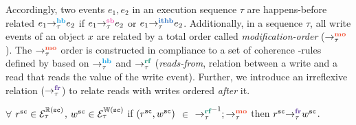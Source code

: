 Accordingly, two events $e_1,e_2$ in an execution sequence $\tau$ are happens-before 
related \ie
$\hb{\tau}{e_1}{e_2}$ if $\seqb{\tau}{e_1}{e_2}$ or $\ithb{\tau}{e_1}{e_2}$.
%
Additionally, in a sequence $\tau$, all write events of an object $x$ are related by a 
total order called {\em modification-order} ($\setMO$).
%
The $\setMO$ order is constructed in compliance to a set of coherence
\lmo-rules defined by \cc based on $\setHB$ and $\setRF$ ({\em reads-from}, 
relation between a write and a read that reads the value of the write event). 
%
Further, we introduce an irreflexive relation  ($\setFR$) to relate  
\sc reads with \sc writes ordered {\em after} it.

\begin{definition}\newline
	$\forall$ $r^\sc \in \ordreads{\sc}_\tau$, $w^\sc \in \ordwrites{\sc}_\tau$
	if $(r^\sc,w^\sc)$ $\in$ $\setRF^{-1};\setMO$ then $\fr{\tau}{r^\sc}{w^\sc}$.
\end{definition}

